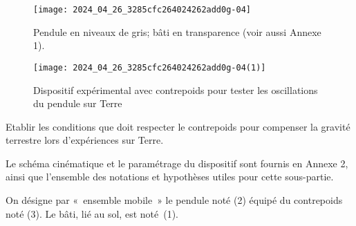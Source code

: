 \begin{figure*}[h!]
    \centering
    \begin{subfigure}[t]{0.45\textwidth}
        \centering
        \texttt{[image: 2024\_04\_26\_3285cfc264024262add0g-04]}
        \caption{\label{ccmp2023_fig_03a} Pendule en niveaux de gris; bâti en transparence (voir aussi Annexe 1).}
    \end{subfigure}%
    \hfill
    \begin{subfigure}[t]{0.45\textwidth}
        \centering
        \texttt{[image: 2024\_04\_26\_3285cfc264024262add0g-04(1)]}
        \caption{\label{ccmp2023_fig_03b} Dispositif expérimental avec contrepoids pour tester les oscillations du pendule sur Terre}
    \end{subfigure}
    \caption{}
\end{figure*}


%
%
%
%
%



\begin{obj}
Etablir les conditions que doit respecter le contrepoids pour compenser la gravité terrestre lors d'expériences sur Terre.
\end{obj}
 

Le schéma cinématique et le paramétrage du dispositif sont fournis en Annexe 2, ainsi que l'ensemble des notations et hypothèses utiles pour cette sous-partie.

On désigne par «~ensemble mobile~» le pendule noté (2) équipé du contrepoids noté (3). Le bâti, lié au sol, est noté~(1).


